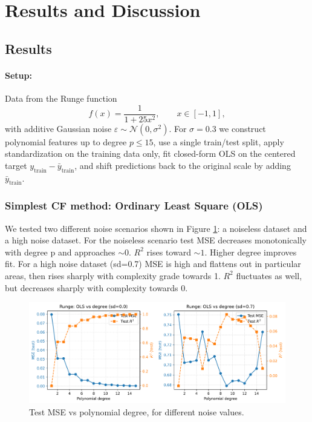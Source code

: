 \documentclass[amssymb,twocolumn,aps]{revtex4-2}
\begin{document}
\section{Results and Discussion}\label{section:results} 

\subsection{Results}

\paragraph{Setup:}
Data from the Runge function
\[
f(x)=\frac{1}{1+25x^{2}}, \qquad x\in[-1,1],
\]
with additive Gaussian noise \(\varepsilon\sim\mathcal N(0,\sigma^{2})\).
For $\sigma = 0.3$  we construct polynomial features up to
degree \(p\le 15\), use a single train/test split, apply standardization
on the training data only, fit closed-form OLS on the centered target
\(y_{\text{train}}-\bar y_{\text{train}}\), and shift predictions back to the
original scale by adding \(\bar y_{\text{train}}\).

\subsubsection{Simplest CF method: Ordinary Least Square (OLS)}

We tested two different noise scenarios shown in Figure \ref{fig:ols_vs_degree}: a noiseless dataset and a high noise dataset. For the noiseless scenario test MSE decreases monotonically with degree p and approaches $\sim 0$. $R^2$ rises toward $\sim 1$. Higher degree improves fit. For a high noise dataset (sd=0.7) MSE is high and flattens out in particular areas, then rises sharply with complexity grade towards 1. $R^2$ fluctuates as well, but decreases sharply with complexity towards 0. 

\begin{figure}[H]
    \centering
    \includegraphics[width=1\linewidth]{Project-1/Figures/runge_ols_mse_r2_vs_degree.png}
    \caption{Test MSE vs polynomial degree, for different noise values.}
    \label{fig:ols_vs_degree}
\end{figure}
\end{document}
